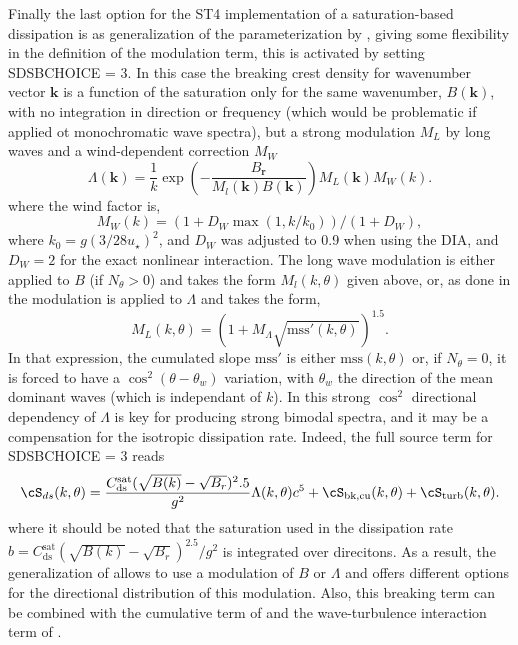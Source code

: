 Finally the last option for the ST4 implementation of a saturation-based dissipation is as generalization 
of the parameterization by \citet{Romero2019}, giving some flexibility in the definition of the modulation 
term, this is activated by setting  {\F  SDSBCHOICE  = 3}. In this case the  breaking crest density for wavenumber vector  
$\mathbf{k}$ is a function of the saturation only for the same wavenumber, $B(\mathbf{k})$, with no integration in direction 
or frequency (which would be problematic if applied ot monochromatic wave spectra), but a strong modulation $M_L$  by long waves
and a wind-dependent correction $M_W$
\begin{equation}
\Lambda (\mathbf{k}) = \frac{1}{k} \exp \left(-\frac{B_{\mathbf{r}}}{M_l(\mathbf{k})  B(\mathbf{k})}\right) M_L(\mathbf{k}) M_W(k).
\end{equation}
where the wind factor is, 
\begin{equation}
 M_W(k)=\left( 1+ D_W  \max(1,k/k_0) \right) / (1+D_W),
\end{equation}
where $k_0=g (3/ 28 u_\star)^2$, and $D_W$ was adjusted to 0.9 when using the DIA, and $D_W=2$ for the exact nonlinear interaction.
The long wave modulation is either applied to $B$ (if $N_\theta > 0$) and takes the form $ M_l(k,\theta)$ given above, 
or, as done in \cite{Romero2019} the modulation is applied to  $\Lambda$ and takes the form, 
\begin{equation}
 M_L(k,\theta)=\left( 1+ M_\Lambda \sqrt{\mathrm{mss}'(k,\theta)}  \right)^{1.5}.
\end{equation}
In that expression, the cumulated slope $\mathrm{mss}'$ is either $\mathrm{mss}(k,\theta)$ or, if $N_\theta=0$, it is forced to have a $\cos^2 (\theta-\theta_w)$ variation, 
with $\theta_w$ the direction of the mean dominant waves (which is independant of $k$). In \cite{Romero2019} this strong $\cos^2$ directional dependency of $\Lambda$ is key for producing 
strong bimodal spectra, and it may be a compensation for the isotropic dissipation rate. Indeed, the full source term for {\F  SDSBCHOICE  = 3} reads 
\begin{eqnarray}
\cS_{ds}(k,\theta)=  \frac{C_{\mathrm{ds}}^{\mathrm{sat}} (\sqrt{B(k)}-\sqrt{B_r} )^2.5}{g^2} \Lambda (k,\theta) c^5 + \cS_{\mathrm{bk,cu}}(k,\theta) + \cS_{\mathrm{turb}}(k,\theta) \label{Sds_all}. \nonumber \\
\end{eqnarray}
where it should be noted that the saturation used in the dissipation rate $b=C_{\mathrm{ds}}^{\mathrm{sat}} (\sqrt{B(k)}-\sqrt{B_r} )^2.5/{g^2}$ is integrated over direcitons. 
As a result, the generalization of \cite{Romero2019} allows to use a modulation of $B$ or $\Lambda$ and offers different options for the directional distribution of this modulation. Also, this breaking term can be combined with the cumulative term of \cite{art:Aea10} and the wave-turbulence interaction term of \citet{art:AJ06}. 

